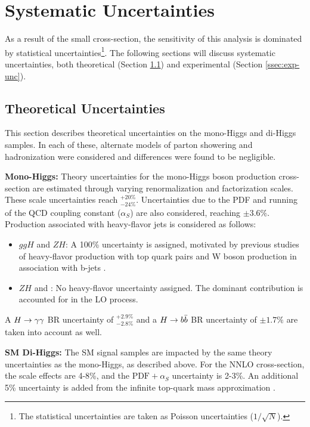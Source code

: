 \section{Systematic Uncertainties}

As a result of the small \hh cross-section, the sensitivity of this analysis is dominated by statistical uncertainties\footnote{The statistical uncertainties are taken as Poisson uncertainties ($1/\sqrt{N}$).}. The following sections will discuss systematic uncertainties, both theoretical (Section \ref{ssec:theory-unc}) and experimental (Section \ref{ssec:exp-unc}).

\subsection{Theoretical Uncertainties} \label{ssec:theory-unc}

This section describes theoretical uncertainties on the mono-Higgs and di-Higgs samples. In each of these, alternate models of parton showering and hadronization were considered and differences were found to be negligible.

\noindent\textbf{Mono-Higgs:} Theory uncertainties for the mono-Higgs boson production cross-section are estimated through varying renormalization and factorization scales. These scale uncertainties reach $^{+20\%}_{-24\%}$. Uncertainties due to the \gls{PDF} and running of the \gls{QCD} coupling constant ($\alpha_{S}$) are also considered, reaching $\pm3.6\%$. Production associated with heavy-flavor jets is considered as follows:

\begin{itemize}
  \item $ggH$ and $ZH$: A 100\% uncertainty is assigned, motivated by previous studies of heavy-flavor production with top quark pairs \cite{heavy-flavor-top} and W boson production in association with b-jets \cite{heavy-flavor-W}.
  \item $ZH$ and \tth: No heavy-flavor uncertainty assigned. The dominant contribution is accounted for in the \gls{LO} process.
\end{itemize}

A $H\rightarrow \gamma\gamma$ \gls{BR} uncertainty of $^{+2.9\%}_{-2.8\%}$ and a $H\rightarrow b\bar{b}$ \gls{BR} uncertainty of $\pm1.7\%$ \cite{hh-crosssections} are taken into account as well.

\noindent\textbf{\gls{SM} Di-Higgs:} The \gls{SM} \hh signal samples are impacted by the same theory uncertainties as the mono-Higgs, as described above. For the \gls{NNLO} cross-section, the scale effects are 4-8\%, and the $\text{PDF}+\alpha_{S}$ uncertainty is 2-3\%. An additional 5\% uncertainty is added from the infinite top-quark mass approximation \cite{nnlo-topquark}.

